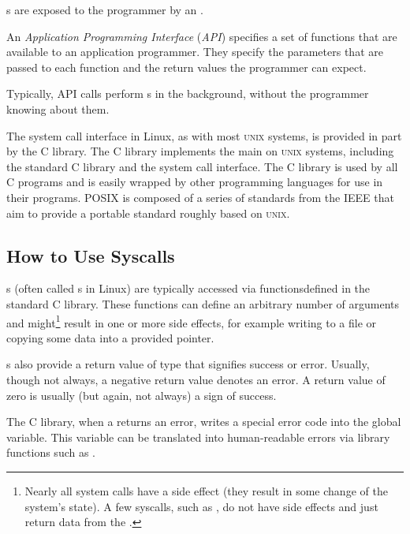 s are exposed to the programmer by an .
\begin{definition}\label{def:API}
  An \emph{Application Programming Interface} (\emph{API}) specifies a set of functions that are available to an application programmer.
  They specify the parameters that are passed to each function and the return values the programmer can expect.

  Typically, API calls perform s in the background, without the programmer knowing about them.
\end{definition}

The system call interface in Linux, as with most \textsc{unix} systems, is provided in part by the C library.
The C library implements the main  on \textsc{unix} systems, including the standard C library and the system call interface.
The C library is used by all C programs and is easily wrapped by other programming languages for use in their programs.
POSIX is composed of a series of standards from the IEEE that aim to provide a portable  standard roughly based on \textsc{unix}.\@

\subsection{How to Use Syscalls}\label{subsec:How_To_Use_Syscalls}
s (often called s in Linux) are typically accessed via functionsdefined in the standard C library.
These functions can define an arbitrary number of arguments and might\footnote{Nearly all system calls have a side effect (they result in some change of the system’s state). A few syscalls, such as , do not have side effects and just return data from the .} result in one or more side effects, for example writing to a file or copying some data into a provided pointer.

s also provide a return value of type  that signifies success or error.
Usually, though not always, a negative return value denotes an error.
A return value of zero is usually (but again, not always) a sign of success.

The C library, when a  returns an error, writes a special error code into the global  variable.
This variable can be translated into human-readable errors via library functions such as .

